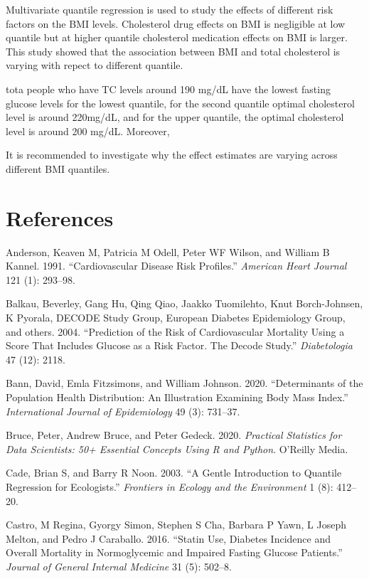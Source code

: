 \documentclass[
  12pt,
]{article}
\begin{document}
Multivariate quantile regression is used to study the effects of different risk factors on the BMI levels. Cholesterol drug effects on BMI is negligible at low quantile but at higher quantile cholesterol medication effects on BMI is larger. This study showed that the association between BMI and total cholesterol is varying with repect to different quantile.

tota people who have TC levels around 190 mg/dL have the lowest fasting glucose levels for the lowest quantile, for the second quantile optimal cholesterol level is around 220mg/dL, and for the upper quantile, the optimal cholesterol level is around 200 mg/dL. Moreover,

It is recommended to investigate why the effect estimates are varying across different BMI quantiles.

\newpage
\section{References}

\hypertarget{refs}{}
\leavevmode\hypertarget{ref-anderson1991}{}%
Anderson, Keaven M, Patricia M Odell, Peter WF Wilson, and William B Kannel. 1991. ``Cardiovascular Disease Risk Profiles.'' \emph{American Heart Journal} 121 (1): 293--98.

\leavevmode\hypertarget{ref-balkau2004prediction}{}%
Balkau, Beverley, Gang Hu, Qing Qiao, Jaakko Tuomilehto, Knut Borch-Johnsen, K Pyorala, DECODE Study Group, European Diabetes Epidemiology Group, and others. 2004. ``Prediction of the Risk of Cardiovascular Mortality Using a Score That Includes Glucose as a Risk Factor. The Decode Study.'' \emph{Diabetologia} 47 (12): 2118.

\leavevmode\hypertarget{ref-bann2020}{}%
Bann, David, Emla Fitzsimons, and William Johnson. 2020. ``Determinants of the Population Health Distribution: An Illustration Examining Body Mass Index.'' \emph{International Journal of Epidemiology} 49 (3): 731--37.

\leavevmode\hypertarget{ref-bruce2020}{}%
Bruce, Peter, Andrew Bruce, and Peter Gedeck. 2020. \emph{Practical Statistics for Data Scientists: 50+ Essential Concepts Using R and Python}. O'Reilly Media.

\leavevmode\hypertarget{ref-cade2003}{}%
Cade, Brian S, and Barry R Noon. 2003. ``A Gentle Introduction to Quantile Regression for Ecologists.'' \emph{Frontiers in Ecology and the Environment} 1 (8): 412--20.

\leavevmode\hypertarget{ref-castro2016}{}%
Castro, M Regina, Gyorgy Simon, Stephen S Cha, Barbara P Yawn, L Joseph Melton, and Pedro J Caraballo. 2016. ``Statin Use, Diabetes Incidence and Overall Mortality in Normoglycemic and Impaired Fasting Glucose Patients.'' \emph{Journal of General Internal Medicine} 31 (5): 502--8.
\end{document}
